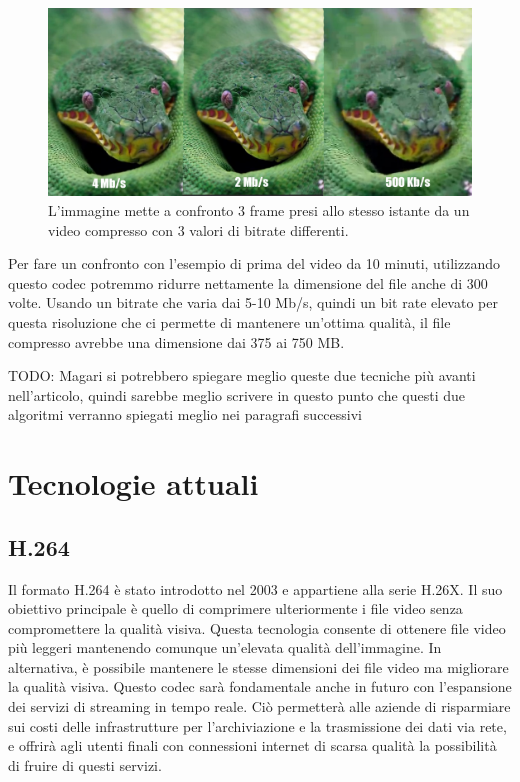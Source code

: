 \documentclass[a4paper,12pt, oneside]{article}
\begin{document}
\begin{figure}[h]
    \centering
    \includegraphics[width=1\textwidth]{images/confronto-bitrate.png}
    \caption{L'immagine mette a confronto 3 frame presi allo stesso istante da un video compresso con 3 valori di bitrate differenti.}
    \label{fig:confronto_bitrate}
\end{figure}

Per fare un confronto con l'esempio di prima del video da 10 minuti, utilizzando questo codec potremmo
ridurre nettamente la dimensione del file anche di 300 volte. Usando un bitrate che varia dai 5-10 Mb/s,
quindi un bit rate elevato per questa risoluzione che ci permette di mantenere un'ottima qualità,
il file compresso avrebbe una dimensione dai 375 ai 750 MB.

TODO: Magari si potrebbero spiegare meglio queste due tecniche più avanti nell'articolo, quindi sarebbe meglio scrivere in questo
punto che questi due algoritmi verranno spiegati meglio nei paragrafi successivi

\section{Tecnologie attuali}
\subsection{H.264}
Il formato H.264 è stato introdotto nel 2003 e appartiene alla serie H.26X. Il suo obiettivo principale
è quello di comprimere ulteriormente i file video senza compromettere la qualità visiva. Questa
tecnologia consente di ottenere file video più leggeri mantenendo comunque un'elevata qualità
dell'immagine. In alternativa, è possibile mantenere le stesse dimensioni dei file video ma migliorare
la qualità visiva. Questo codec sarà fondamentale anche in futuro con l'espansione dei servizi di
streaming in tempo reale. Ciò permetterà alle aziende di risparmiare sui costi delle infrastrutture
per l'archiviazione e la trasmissione dei dati via rete, e offrirà agli utenti finali con connessioni
internet di scarsa qualità la possibilità di fruire di questi servizi.
\end{document}
